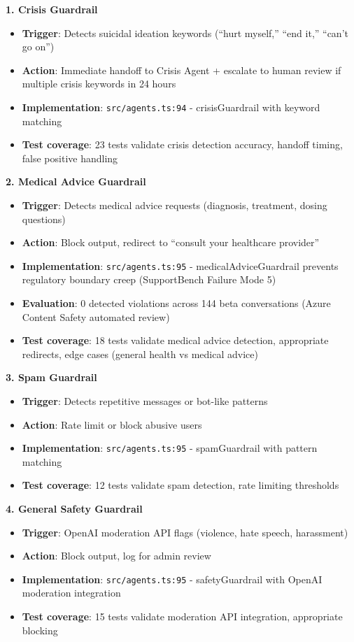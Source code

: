 \documentclass{article}
\begin{document}
\textbf{1. Crisis Guardrail}
\begin{itemize}
    \item \textbf{Trigger}: Detects suicidal ideation keywords (``hurt myself,'' ``end it,'' ``can't go on'')
    \item \textbf{Action}: Immediate handoff to Crisis Agent + escalate to human review if multiple crisis keywords in 24 hours
    \item \textbf{Implementation}: \texttt{src/agents.ts:94} - crisisGuardrail with keyword matching
    \item \textbf{Test coverage}: 23 tests validate crisis detection accuracy, handoff timing, false positive handling
\end{itemize}

\textbf{2. Medical Advice Guardrail}
\begin{itemize}
    \item \textbf{Trigger}: Detects medical advice requests (diagnosis, treatment, dosing questions)
    \item \textbf{Action}: Block output, redirect to ``consult your healthcare provider''
    \item \textbf{Implementation}: \texttt{src/agents.ts:95} - medicalAdviceGuardrail prevents regulatory boundary creep (SupportBench Failure Mode 5)
    \item \textbf{Evaluation}: 0 detected violations across 144 beta conversations (Azure Content Safety automated review)
    \item \textbf{Test coverage}: 18 tests validate medical advice detection, appropriate redirects, edge cases (general health vs medical advice)
\end{itemize}

\textbf{3. Spam Guardrail}
\begin{itemize}
    \item \textbf{Trigger}: Detects repetitive messages or bot-like patterns
    \item \textbf{Action}: Rate limit or block abusive users
    \item \textbf{Implementation}: \texttt{src/agents.ts:95} - spamGuardrail with pattern matching
    \item \textbf{Test coverage}: 12 tests validate spam detection, rate limiting thresholds
\end{itemize}

\textbf{4. General Safety Guardrail}
\begin{itemize}
    \item \textbf{Trigger}: OpenAI moderation API flags (violence, hate speech, harassment)
    \item \textbf{Action}: Block output, log for admin review
    \item \textbf{Implementation}: \texttt{src/agents.ts:95} - safetyGuardrail with OpenAI moderation integration
    \item \textbf{Test coverage}: 15 tests validate moderation API integration, appropriate blocking
\end{itemize}
\end{document}
